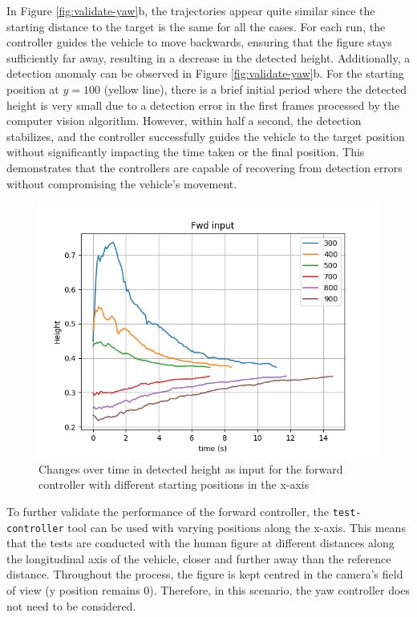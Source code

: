 In Figure \ref{fig:validate-yaw}b, the trajectories appear quite similar since the starting distance to the target is the same for all the cases. For each run, the controller guides the vehicle to move backwards, ensuring that the figure stays sufficiently far away, resulting in a decrease in the detected height. Additionally, a detection anomaly can be observed in Figure \ref{fig:validate-yaw}b. For the starting position at $y=100$ (yellow line), there is a brief initial period where the detected height is very small due to a detection error in the first frames processed by the computer vision algorithm. However, within half a second, the detection stabilizes, and the controller successfully guides the vehicle to the target position without significantly impacting the time taken or the final position. This demonstrates that the controllers are capable of recovering from detection errors without compromising the vehicle's movement.


\begin{figure}[H]
  \centering
  \includegraphics[width=.7\textwidth, keepaspectratio]{img/pid/validation_fwd.png}
  \caption{Changes over time in detected height as input for the forward controller with different starting positions in the x-axis}
  \label{fig:validate-fwd}
\end{figure}


To further validate the performance of the forward controller, the \texttt{test-controller} tool can be used with varying positions along the x-axis. This means that the tests are conducted with the human figure at different distances along the longitudinal axis of the vehicle, closer and further away than the reference distance. Throughout the process, the figure is kept centred in the camera's field of view (y position remains 0). Therefore, in this scenario, the yaw controller does not need to be considered.

